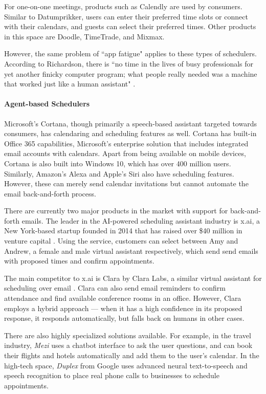 \documentclass{article}
\begin{document}
For one-on-one meetings, products such as Calendly are used by consumers. Similar to Datumprikker, users can enter their preferred time slots or connect with their calendars, and guests can select their preferred times. Other products in this space are Doodle, TimeTrade, and Mixmax.

However, the same problem of ``app fatigue" applies to these types of schedulers. According to Richardson, there is ``no time in the lives of busy professionals for yet another finicky computer program; what people really needed was a machine that worked just like a human assistant"  \cite{noauthor_ai_nodate}.
 
 \paragraph{Agent-based Schedulers}
 
 Microsoft's Cortana, though primarily a speech-based assistant targeted towards consumers, has calendaring and scheduling features as well. Cortana has built-in Office 365 capabilities, Microsoft's enterprise solution that includes integrated email accounts with calendars. Apart from being available on mobile devices, Cortana is also built into Windows 10, which has over 400 million users. Similarly, Amazon's Alexa and Apple's Siri also have scheduling features. However, these can merely send calendar invitations but cannot automate the email back-and-forth process.
 
 There are currently two major products in the market with support for back-and-forth emails. The leader in the AI-powered scheduling assistant industry is x.ai, a New York-based startup founded in 2014 that has raised over \$40 million in venture capital \cite{noauthor_x.ais_2018}. Using the service, customers can select between Amy and Andrew, a female and male virtual assistant respectively, which send send emails with proposed times and confirm appointments.
 
The main competitor to x.ai is Clara by Clara Labs, a similar virtual assistant for scheduling over email \cite{noauthor_clara_nodate}. Clara can also send email reminders to confirm attendance and find available conference rooms in an office. However, Clara employs a hybrid approach --- when it has a high confidence in its proposed response, it responds automatically, but falls back on humans in other cases.

There are also highly specialized solutions available. For example, in the travel industry, \emph{Mezi} uses a chatbot interface to ask the user questions, and can book their flights and hotels automatically and add them to the user's calendar. In the high-tech space, \emph{Duplex} from Google uses advanced neural text-to-speech and speech recognition to place real phone calls to businesses to schedule appointments.
\end{document}
